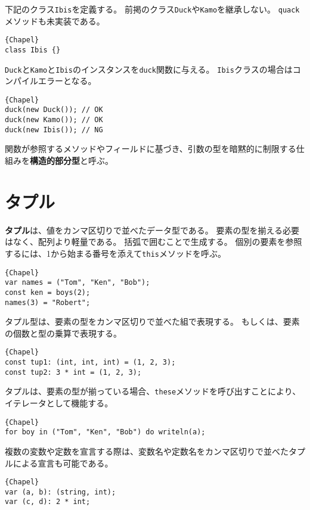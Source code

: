 \documentclass[10pt,a4paper]{book}
\begin{document}
下記のクラス\verb#Ibis#を定義する。
前掲のクラス\verb#Duck#や\verb#Kamo#を継承しない。
\verb#quack#メソッドも未実装である。

\begin{Verbatim}{Chapel}
class Ibis {}
\end{Verbatim}

\verb#Duck#と\verb#Kamo#と\verb#Ibis#のインスタンスを\verb#duck#関数に与える。
\verb#Ibis#クラスの場合はコンパイルエラーとなる。

\begin{Verbatim}{Chapel}
duck(new Duck()); // OK
duck(new Kamo()); // OK
duck(new Ibis()); // NG
\end{Verbatim}

関数が参照するメソッドやフィールドに基づき、引数の型を暗黙的に制限する仕組みを\textbf{構造的部分型}と呼ぶ。

\chapter{タプル\label{sec:tuple}}

\textbf{タプル}は、値をカンマ区切りで並べたデータ型である。
要素の型を揃える必要はなく、配列より軽量である。
括弧で囲むことで生成する。
個別の要素を参照するには、1から始まる番号を添えて\verb#this#メソッドを呼ぶ。

\begin{Verbatim}{Chapel}
var names = ("Tom", "Ken", "Bob");
const ken = boys(2);
names(3) = "Robert";
\end{Verbatim}

タプル型は、要素の型をカンマ区切りで並べた組で表現する。
もしくは、要素の個数と型の乗算で表現する。

\begin{Verbatim}{Chapel}
const tup1: (int, int, int) = (1, 2, 3);
const tup2: 3 * int = (1, 2, 3);
\end{Verbatim}

タプルは、要素の型が揃っている場合、\verb#these#メソッドを呼び出すことにより、イテレータとして機能する。

\begin{Verbatim}{Chapel}
for boy in ("Tom", "Ken", "Bob") do writeln(a);
\end{Verbatim}

複数の変数や定数を宣言する際は、変数名や定数名をカンマ区切りで並べたタプルによる宣言も可能である。

\begin{Verbatim}{Chapel}
var (a, b): (string, int);
var (c, d): 2 * int;
\end{Verbatim}
\end{document}
